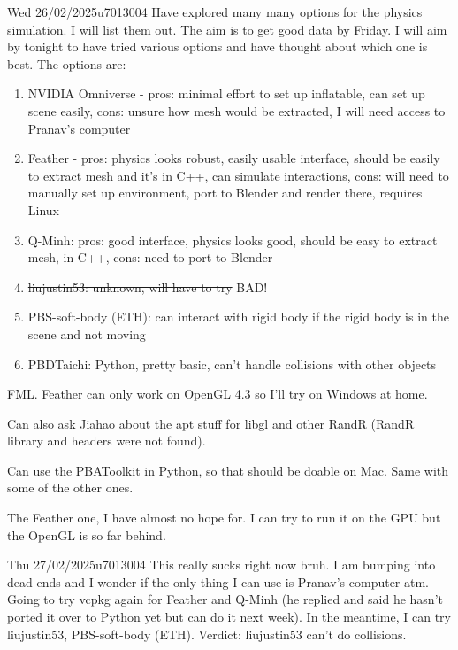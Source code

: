 \documentclass{project-logbook}
\begin{document}
	\begin{MeetingMinutes}{Wed 26/02/2025}{u7013004}
		Have explored many many options for the physics simulation. I will list them out. The aim is to get good data by Friday. I will aim by tonight to have tried various options and have thought about which one is best.
		The options are:
		\begin{enumerate}
			\item NVIDIA Omniverse - pros: minimal effort to set up inflatable, can set up scene easily, cons: unsure how mesh would be extracted, I will need access to Pranav's computer
			\item Feather - pros: physics looks robust, easily usable interface, should be easily to extract mesh and it's in C++, can simulate interactions, cons: will need to manually set up environment, port to Blender and render there, requires Linux
			\item Q-Minh: pros: good interface, physics looks good, should be easy to extract mesh, in C++, cons: need to port to Blender
			\item \sout{liujustin53: unknown, will have to try} BAD!
			\item PBS-soft-body (ETH): can interact with rigid body if the rigid body is in the scene and not moving
			\item PBDTaichi: Python, pretty basic, can't handle collisions with other objects
		\end{enumerate}
		
		FML. Feather can only work on OpenGL 4.3 so I'll try on Windows at home.

		Can also ask Jiahao about the apt stuff for libgl and other RandR (RandR library and headers were not found).

		Can use the PBAToolkit in Python, so that should be doable on Mac. Same with some of the other ones.
		
		The Feather one, I have almost no hope for. I can try to run it on the GPU but the OpenGL is so far behind.
	\end{MeetingMinutes}

	\begin{MeetingMinutes}{Thu 27/02/2025}{u7013004}
		This really sucks right now bruh. I am bumping into dead ends and I wonder if the only thing I can use is Pranav's computer atm.
		Going to try vcpkg again for Feather and Q-Minh (he replied and said he hasn't ported it over to Python yet but can do it next week).
		In the meantime, I can try liujustin53, PBS-soft-body (ETH).
		Verdict: liujustin53 can't do collisions.
	\end{MeetingMinutes}
\end{document}
